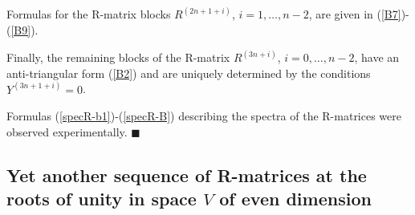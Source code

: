 \documentclass[11pt]{article}
\begin{document}
Formulas for the R-matrix blocks $R^{(2n+1+i)}$, $i=1,\dots ,n-2$, are given in (\ref{B7})-(\ref{B9}).\smallskip

Finally, the remaining blocks of the R-matrix $R^{(3n+i)}$, $i=0,\dots ,n-2$, have an anti-triangular form (\ref{B2}) and are uniquely determined by the conditions $Y^{(3n+1+i)}=0$.

Formulas (\ref{specR-b1})-(\ref{specR-B}) describing the spectra of the R-matrices were observed experimentally. 
\hfill$\blacksquare$\medskip







\subsection{Yet another sequence of R-matrices at the roots of unity in space $V$ of even dimension} 
\end{document}
